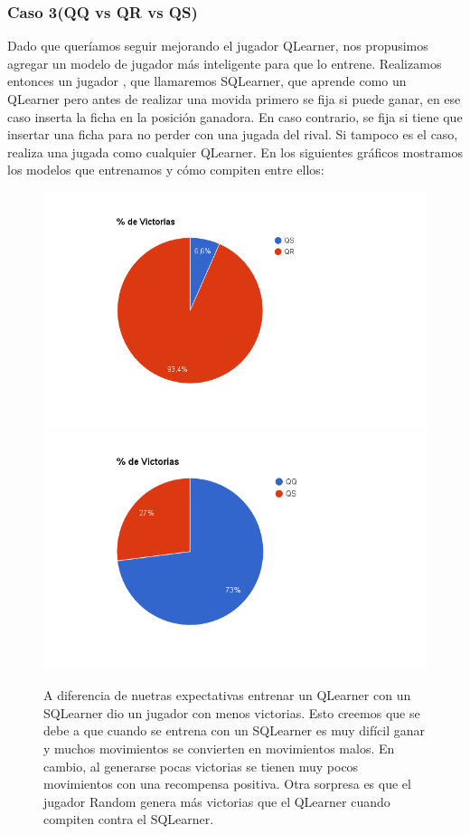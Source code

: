 \documentclass[10pt, a4paper]{article}
\begin{document}
\subsubsection{Caso 3(QQ vs QR vs QS)}

Dado que queríamos seguir mejorando el jugador QLearner, nos propusimos agregar un modelo de jugador más inteligente para que lo entrene.  Realizamos entonces un jugador , que llamaremos SQLearner, que aprende como un QLearner pero antes de realizar una movida primero se fija si puede ganar, en ese caso inserta la ficha en la posición ganadora. En caso contrario, se fija si tiene que insertar una ficha para no perder con una jugada del rival. Si tampoco es el caso, realiza una jugada como cualquier QLearner.
En los siguientes gráficos mostramos los modelos que entrenamos y cómo compiten entre ellos:


\begin{figure}[H]
  \begin{minipage}[c]{1\textwidth}
  \includegraphics[scale=0.3]{QRvsQS.png}
  \includegraphics[scale=0.3]{QQvsQS.png}
  \caption{A diferencia de nuetras expectativas entrenar un QLearner con un SQLearner dio un jugador con menos victorias. Esto creemos que se debe a que cuando se entrena con un SQLearner es muy difícil ganar y muchos movimientos se convierten en movimientos malos. En cambio, al generarse pocas victorias se tienen muy pocos movimientos con una recompensa positiva.
  Otra sorpresa es que el jugador Random genera más victorias que el QLearner cuando compiten contra el SQLearner.}
  \end{minipage}
\end{figure}
\end{document}
